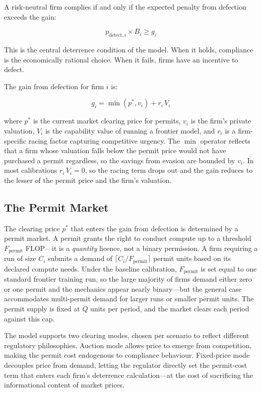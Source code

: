 A risk-neutral firm complies if and only if the expected penalty from defection exceeds the gain:

\begin{equation}
p_{\mathrm{detect},i} \times B_i \geq g_i
\label{eq:deterrence}
\end{equation}

This is the central deterrence condition of the model. When it holds, compliance is the economically rational choice. When it fails, firms have an incentive to defect.

The gain from defection for firm $i$ is:

\begin{equation}
g_i = \min(p^*, v_i) + r_i \, V_i
\label{eq:gain}
\end{equation}

where $p^*$ is the current market clearing price for permits, $v_i$ is the firm's private valuation, $V_i$ is the capability value of running a frontier model, and $r_i$ is a firm-specific racing factor capturing competitive urgency. The $\min$ operator reflects that a firm whose valuation falls below the permit price would not have purchased a permit regardless, so the savings from evasion are bounded by $v_i$. In most calibrations $r_i \, V_i = 0$, so the racing term drops out and the gain reduces to the lesser of the permit price and the firm's valuation.

\subsection{The Permit Market}
\label{sec:permit-market}

The clearing price $p^*$ that enters the gain from defection is determined by a permit market. A permit grants the right to conduct compute up to a threshold $F_{\text{permit}}$ FLOP---it is a \emph{quantity} licence, not a binary permission. A firm requiring a run of size $C_i$ submits a demand of $\lceil C_i / F_{\text{permit}} \rceil$ permit units based on its declared compute needs. Under the baseline calibration, $F_{\text{permit}}$ is set equal to one standard frontier training run, so the large majority of firms demand either zero or one permit and the mechanics appear nearly binary---but the general case accommodates multi-permit demand for larger runs or smaller permit units. The permit supply is fixed at $Q$ units per period, and the market clears each period against this cap.

The model supports two clearing modes, chosen per scenario to reflect different regulatory philosophies. Auction mode allows price to emerge from competition, making the permit cost endogenous to compliance behaviour. Fixed-price mode decouples price from demand, letting the regulator directly set the permit-cost term that enters each firm's deterrence calculation---at the cost of sacrificing the informational content of market prices.

